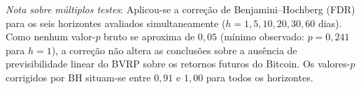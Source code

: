 \par\smallskip
\footnotesize\textit{Nota sobre múltiplos testes}:
Aplicou-se a correção de Benjamini--Hochberg (FDR) para os seis horizontes
avaliados simultaneamente ($h = 1, 5, 10, 20, 30, 60$ dias).
Como nenhum valor-$p$ bruto se aproxima de $0{,}05$
(mínimo observado: $p = 0{,}241$ para $h = 1$),
a correção não altera as conclusões sobre a ausência de previsibilidade
linear do BVRP sobre os retornos futuros do Bitcoin.
Os valores-$p$ corrigidos por BH situam-se entre $0{,}91$ e $1{,}00$
para todos os horizontes.
\par\normalsize
